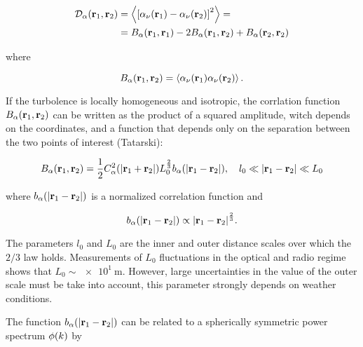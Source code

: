 \begin{equation}
        \begin{split}
                \mathcal{D}_\alpha\qty(\vb{r}_1,\vb{r}_2) & =
                \expval{\qty[\alpha_\nu\qty(\vb{r}_1) -
                \alpha_\nu\qty(\vb{r}_2)]^2} =
                \\
                & = B_\alpha\qty(\vb{r}_1,\vb{r}_1) -
                2B_\alpha\qty(\vb{r}_1,\vb{r}_2) + B_\alpha\qty(\vb{r}_2,\vb{r}_2)
        \end{split}
\end{equation}

where

\begin{equation}
        B_\alpha\qty(\vb{r}_1,\vb{r}_2) =
        \expval{\alpha_\nu\qty(\vb{r}_1)\alpha_\nu\qty(\vb{r}_2)}.
\end{equation}

If the turbolence is locally homogeneous and isotropic, the corrlation
function $B_\alpha\qty(\vb{r}_1,\vb{r}_2)$ can be written as the product of
a squared amplitude, witch depends on the coordinates, and a function that
depends only on the separation between the two points of interest (Tatarski):

\begin{equation}
        B_\alpha\qty(\vb{r}_1,\vb{r}_2) = \frac{1}{2}
        C^2_\alpha\qty(\abs{\vb{r}_1 + \vb{r}_2})
        L^{\frac{2}{3}}_0 b_\alpha\qty(\abs{\vb{r}_1 - \vb{r}_2}),\quad
        l_0 \ll \abs{\vb{r}_1 - \vb{r}_2} \ll L_0
\end{equation}

where $b_\alpha\qty(\abs{\vb{r}_1 - \vb{r}_2})$ is a normalized correlation
function and

\begin{equation}
        b_\alpha\qty(\abs{\vb{r}_1 - \vb{r}_2}) \propto
        \abs{\vb{r}_1 - \vb{r}_2}^\frac{2}{3}.
\end{equation}

The parameters $l_0$ and $L_0$ are the inner and outer distance scales over
which the $2/3$ law holds. Measurements of $L_0$ fluctuations in the
optical and radio regime shows that $L_0 \sim \SI{e1}{\meter}$. However, large
uncertainties in the value of the outer scale must be take into account,
this parameter strongly depends on weather conditions.

The function $b_\alpha\qty(\abs{\vb{r}_1 - \vb{r}_2})$ can be related to a
spherically symmetric power spectrum $\phi\qty(k)$ by

